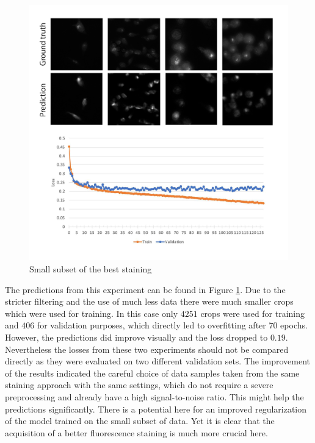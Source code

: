\begin{figure}[htb]
	\begin{center}
		\includegraphics[width=\linewidth]{bilder/golgi/12-13/12-13.png}
		\caption{Small subset of the best staining}\label{fig:12-13}
	\end{center}
\end{figure}

The predictions from this experiment can be found in Figure \ref{fig:12-13}. Due to the stricter filtering and the use of much less data there were much smaller crops which were used for training. In this case only $4251$ crops were used for training and $406$ for validation purposes, which directly led to overfitting after $70$ epochs. However, the predictions did improve visually and the loss dropped to $0.19$. Nevertheless the losses from these two experiments should not be compared directly as they were evaluated on two different validation sets. The improvement of the results indicated the careful choice of data samples taken from the same staining approach with the same settings, which do not require a severe preprocessing and already have a high signal-to-noise ratio. This might help the predictions significantly. There is a potential here for an improved regularization of the model trained on the small subset of data. Yet it is clear that the acquisition of a better fluorescence staining is much more crucial here.